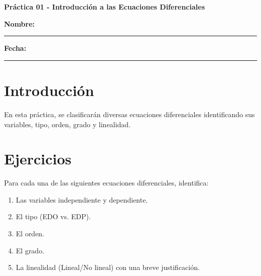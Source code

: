 \documentclass[a4paper,11pt]{article}
\begin{document}
\begin{center}
    \Large\textbf{Práctica 01 - Introducción a las Ecuaciones Diferenciales}\\[1cm]  

\end{center}
  \textbf{Nombre:} \rule{9cm}{0.4pt}  \textbf{Fecha:} \rule{4.5cm}{0.4pt}

\section*{Introducción}
En esta práctica, se clasificarán diversas ecuaciones diferenciales identificando sus variables, tipo, orden, grado y linealidad.

\section*{Ejercicios}

Para cada una de las siguientes ecuaciones diferenciales, identifica:
\begin{enumerate}[label=(\alph*)]
    \item Las variables independiente y dependiente.
    \item El tipo (EDO vs. EDP).
    \item El orden.
    \item El grado.
    \item La linealidad (Lineal/No lineal) con una breve justificación.
\end{enumerate}

\vspace{0.5cm}
\end{document}
